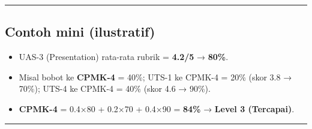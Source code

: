 \documentclass[
  letterpaper,
  DIV=11,
  numbers=noendperiod]{scrreprt}
\providecommand{\tightlist}{%
  \setlength{\itemsep}{0pt}\setlength{\parskip}{0pt}}
\begin{document}
\begin{center}\rule{0.5\linewidth}{0.5pt}\end{center}

\subsection*{Contoh mini (ilustratif)}\label{contoh-mini-ilustratif}

\begin{itemize}
\tightlist
\item
  UAS-3 (Presentation) rata-rata rubrik = \textbf{4.2/5} →
  \textbf{80\%}.
\item
  Misal bobot ke \textbf{CPMK-4} = 40\%; UTS-1 ke CPMK-4 = 20\% (skor
  3.8 → 70\%); UTS-4 ke CPMK-4 = 40\% (skor 4.6 → 90\%).
\item
  \textbf{CPMK-4} = 0.4×80 + 0.2×70 + 0.4×90 = \textbf{84\%} →
  \textbf{Level 3 (Tercapai)}.
\end{itemize}

\begin{center}\rule{0.5\linewidth}{0.5pt}\end{center}
\end{document}
